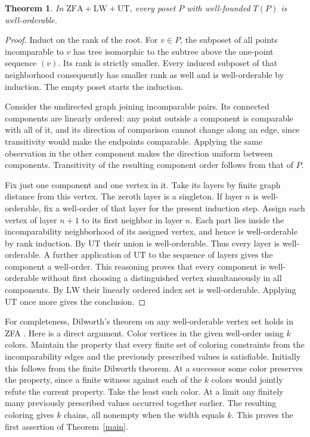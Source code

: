 \documentclass[11pt]{article}
\newtheorem{theorem}{Theorem}
\begin{document}
\begin{theorem}\label{rank}
In $\mathrm{ZFA}+\mathrm{LW}+\mathrm{UT}$, every poset $P$ with well-founded $T(P)$ is well-orderable.
\end{theorem}
\begin{proof}
Induct on the rank of the root. For $v\in P$, the subposet of all points incomparable to $v$ has tree isomorphic to the subtree above the one-point sequence $(v)$. Its rank is strictly smaller. Every induced subposet of that neighborhood consequently has smaller rank as well and is well-orderable by induction. The empty poset starts the induction.

Consider the undirected graph joining incomparable pairs. Its connected components are linearly ordered: any point outside a component is comparable with all of it, and its direction of comparison cannot change along an edge, since transitivity would make the endpoints comparable. Applying the same observation in the other component makes the direction uniform between components. Transitivity of the resulting component order follows from that of $P$.

Fix just one component and one vertex in it. Take its layers by finite graph distance from this vertex. The zeroth layer is a singleton. If layer $n$ is well-orderable, fix a well-order of that layer for the present induction step. Assign each vertex of layer $n+1$ to its first neighbor in layer $n$. Each part lies inside the incomparability neighborhood of its assigned vertex, and hence is well-orderable by rank induction. By $\mathrm{UT}$ their union is well-orderable. Thus every layer is well-orderable. A further application of $\mathrm{UT}$ to the sequence of layers gives the component a well-order. This reasoning proves that every component is well-orderable without first choosing a distinguished vertex simultaneously in all components. By $\mathrm{LW}$ their linearly ordered index set is well-orderable. Applying $\mathrm{UT}$ once more gives the conclusion.
\end{proof}

For completeness, Dilworth's theorem on any well-orderable vertex set holds in ZFA \cite[Theorem 3.1(i)]{tac}. Here is a direct argument. Color vertices in the given well-order using $k$ colors. Maintain the property that every finite set of coloring constraints from the incomparability edges and the previously prescribed values is satisfiable. Initially this follows from the finite Dilworth theorem. At a successor some color preserves the property, since a finite witness against each of the $k$ colors would jointly refute the current property. Take the least such color. At a limit any finitely many previously prescribed values occurred together earlier. The resulting coloring gives $k$ chains, all nonempty when the width equals $k$. This proves the first assertion of Theorem~\ref{main}.
\end{document}

